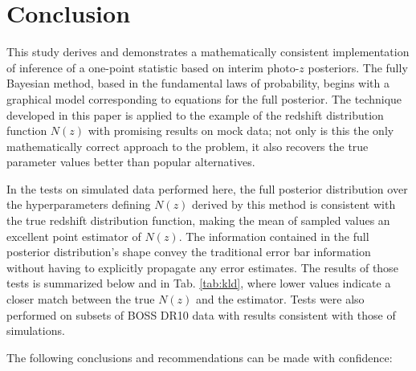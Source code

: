 \section{Conclusion}

This study derives and demonstrates a mathematically consistent implementation of inference of a one-point statistic based on interim photo-$z$ posteriors.  
The fully Bayesian method, based in the fundamental laws of probability, begins with a graphical model corresponding to equations for the full posterior.  
The technique developed in this paper is applied to the example of the redshift distribution function $N(z)$ with promising results on mock data; not only is this the only mathematically correct approach to the problem, it also recovers the true parameter values better than popular alternatives.  

In the tests on simulated data performed here, the full posterior distribution over the hyperparameters defining $N(z)$ derived by this method is consistent with the true redshift distribution function, making the mean of sampled values an excellent point estimator of $N(z)$.  
The information contained in the full posterior distribution's shape convey the traditional error bar information without having to explicitly propagate any error estimates.  
The results of those tests is summarized below and in Tab. \ref{tab:kld}, where lower values indicate a closer match between the true $N(z)$ and the estimator.  
Tests were also performed on subsets of BOSS DR10 data with results consistent with those of simulations.

The following conclusions and recommendations can be made with confidence:


